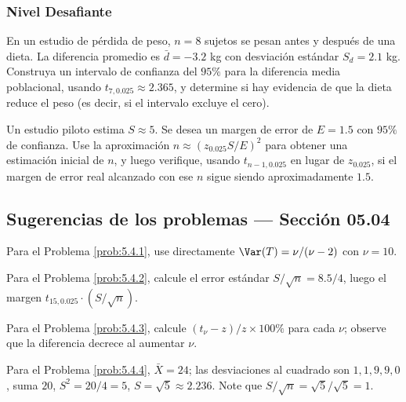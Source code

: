 \subsubsection*{Nivel Desafiante}

\begin{problema}
	\label{prob:5.4.9}
	En un estudio de pérdida de peso, $n=8$ sujetos se pesan antes y después de una dieta. La diferencia promedio es $\bar d=-3.2$ kg con desviación estándar $S_d=2.1$ kg. Construya un intervalo de confianza del $95\%$ para la diferencia media poblacional, usando $t_{7,0.025}\approx 2.365$, y determine si hay evidencia de que la dieta reduce el peso (es decir, si el intervalo excluye el cero).
\end{problema}

\begin{problema}
	\label{prob:5.4.10}
	Un estudio piloto estima $S\approx 5$. Se desea un margen de error de $E=1.5$ con $95\%$ de confianza. Use la aproximación $n\approx(z_{0.025}S/E)^2$ para obtener una estimación inicial de $n$, y luego verifique, usando $t_{n-1,0.025}$ en lugar de $z_{0.025}$, si el margen de error real alcanzado con ese $n$ sigue siendo aproximadamente $1.5$.
\end{problema}

\subsection*{Sugerencias de los problemas --- Sección 05.04}

\begin{sugerencia}
	\label{sug:5.4.1}
	Para el Problema \ref{prob:5.4.1}, use directamente $\Var(T)=\nu/(\nu-2)$ con $\nu=10$.
\end{sugerencia}

\begin{sugerencia}
	\label{sug:5.4.2}
	Para el Problema \ref{prob:5.4.2}, calcule el error estándar $S/\sqrt n = 8.5/4$, luego el margen $t_{15,0.025}\cdot(S/\sqrt n)$.
\end{sugerencia}

\begin{sugerencia}
	\label{sug:5.4.3}
	Para el Problema \ref{prob:5.4.3}, calcule $(t_\nu-z)/z \times 100\%$ para cada $\nu$; observe que la diferencia decrece al aumentar $\nu$.
\end{sugerencia}

\begin{sugerencia}
	\label{sug:5.4.4}
	Para el Problema \ref{prob:5.4.4}, $\bar X=24$; las desviaciones al cuadrado son $1,1,9,9,0$, suma $20$, $S^2=20/4=5$, $S=\sqrt 5\approx 2.236$. Note que $S/\sqrt n = \sqrt5/\sqrt5=1$.
\end{sugerencia}

